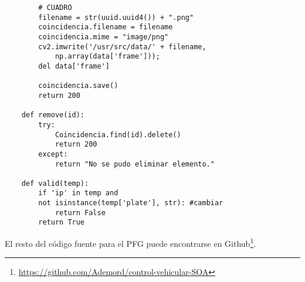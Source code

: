 \begin{mdframed}[linecolor=black, topline=true, bottomline=true,
  leftline=false, rightline=false, backgroundcolor=LightGray,userdefinedwidth=\textwidth]
\begin{verbatim}
        # CUADRO
        filename = str(uuid.uuid4()) + ".png"
        coincidencia.filename = filename
        coincidencia.mime = "image/png"
        cv2.imwrite('/usr/src/data/' + filename,
            np.array(data['frame'])); 
        del data['frame']

        coincidencia.save()
        return 200

    def remove(id):
        try:
            Coincidencia.find(id).delete()
            return 200
        except:
            return "No se pudo eliminar elemento."

    def valid(temp):
        if 'ip' in temp and 
        not isinstance(temp['plate'], str): #cambiar
            return False
        return True
\end{verbatim}
\end{mdframed}

El resto del código fuente para el PFG puede encontrarse en Github\footnote{\url{https://github.com/Ademord/control-vehicular-SOA}}.